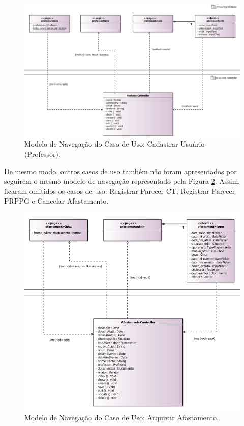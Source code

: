 \begin{figure}[h]
	\centering
	\includegraphics[width=1\textwidth]{figuras/figura-arquitetura-navegacao1.png}
	\caption{Modelo de Navegação do Caso de Uso: Cadastrar Usuário (Professor).}
	\label{figura-arquitetura-navegacao1}
\end{figure}

De mesmo modo, outros casos de uso também não foram apresentados por seguirem o mesmo modelo de navegação representado pela Figura \ref{figura-arquitetura-navegacao2}. Assim, ficaram omitidos os casos de uso: Registrar Parecer CT, Registrar Parecer PRPPG e Cancelar Afastamento. 

\begin{figure}[h]
	\centering
	\includegraphics[width=1\textwidth]{figuras/figura-arquitetura-navegacao2.png}
	\caption{Modelo de Navegação do Caso de Uso: Arquivar Afastamento.}
	\label{figura-arquitetura-navegacao2}
\end{figure}

